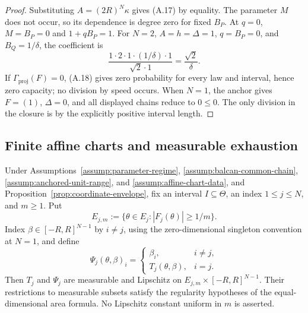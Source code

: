 \begin{proof}
Substituting $A=(2R)^N\kappa$ gives (A.17) by equality.  The parameter $M$
does not occur, so its dependence is degree zero for fixed $B_P$.  At $q=0$,
$M=B_P=0$ and $1+qB_P=1$.  For
$N=2$, $A=h=\Delta=1$, $q=B_P=0$, and $B_Q=1/\delta$, the coefficient is
\[
\frac{1\cdot2\cdot1\cdot(1/\delta)\cdot1}{\sqrt2\cdot1}
=\frac{\sqrt2}{\delta}.
\tag{A.24}
\]
If $\Gamma_{\mathrm{proj}}(F)=0$, (A.18) gives zero probability for every
law and interval, hence zero capacity; no division by speed occurs.  When
$N=1$, the anchor gives $F=(1)$, $\Delta=0$, and all displayed chains reduce
to $0\leq0$.  The only division in the closure is by the explicitly positive
interval length.
\end{proof}

\subsection{Finite affine charts and measurable exhaustion}
\label{app:affine-charts}

\begin{lemma}
\label{lem:finite-chart-legality}
Under Assumptions~\ref{assump:parameter-regime},
\ref{assump:balcan-common-chain},
\ref{assump:anchored-unit-range}, and
\ref{assump:affine-chart-data}, and
Proposition~\ref{prop:coordinate-envelope}, fix an interval
$I\subseteq\Theta$, an index $1\leq j\leq N$, and $m\geq1$.  Put
\[
E_{j,m}:=\{\theta\in E_j:|F_j(\theta)|\geq1/m\}.
\]
Index $\beta\in[-R,R]^{N-1}$ by $i\neq j$, using the zero-dimensional
singleton convention at $N=1$, and define
\[
\Psi_j(\theta,\beta)_i=
\begin{cases}
\beta_i,&i\neq j,\\
T_j(\theta,\beta),&i=j.
\end{cases}
\]
Then $T_j$ and $\Psi_j$ are measurable and Lipschitz on
$E_{j,m}\times[-R,R]^{N-1}$.  Their restrictions to measurable subsets
satisfy the regularity hypotheses of the equal-dimensional area formula.  No
Lipschitz constant uniform in $m$ is asserted.
\end{lemma}

